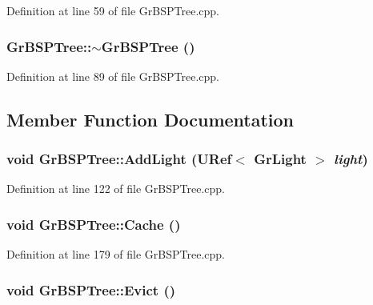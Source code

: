Definition at line 59 of file GrBSPTree.cpp.\hypertarget{class_gr_b_s_p_tree_c3e9b4ebbae5f0abe4b0a9e01e030e27}{
\subsubsection[{$\sim$GrBSPTree}]{\setlength{\rightskip}{0pt plus 5cm}GrBSPTree::$\sim$GrBSPTree ()}}
\label{class_gr_b_s_p_tree_c3e9b4ebbae5f0abe4b0a9e01e030e27}




Definition at line 89 of file GrBSPTree.cpp.

\subsection{Member Function Documentation}
\hypertarget{class_gr_b_s_p_tree_b5b7d54243589001d2113518468109ba}{
\subsubsection[{AddLight}]{\setlength{\rightskip}{0pt plus 5cm}void GrBSPTree::AddLight ({\bf URef}$<$ {\bf GrLight} $>$ {\em light})}}
\label{class_gr_b_s_p_tree_b5b7d54243589001d2113518468109ba}




Definition at line 122 of file GrBSPTree.cpp.\hypertarget{class_gr_b_s_p_tree_ec1f9b6ad00f5859a6e18b298651b00b}{
\subsubsection[{Cache}]{\setlength{\rightskip}{0pt plus 5cm}void GrBSPTree::Cache ()}}
\label{class_gr_b_s_p_tree_ec1f9b6ad00f5859a6e18b298651b00b}




Definition at line 179 of file GrBSPTree.cpp.\hypertarget{class_gr_b_s_p_tree_af5e1a8c04f0b1a5e6ed48196078906a}{
\subsubsection[{Evict}]{\setlength{\rightskip}{0pt plus 5cm}void GrBSPTree::Evict ()}}
\label{class_gr_b_s_p_tree_af5e1a8c04f0b1a5e6ed48196078906a}




